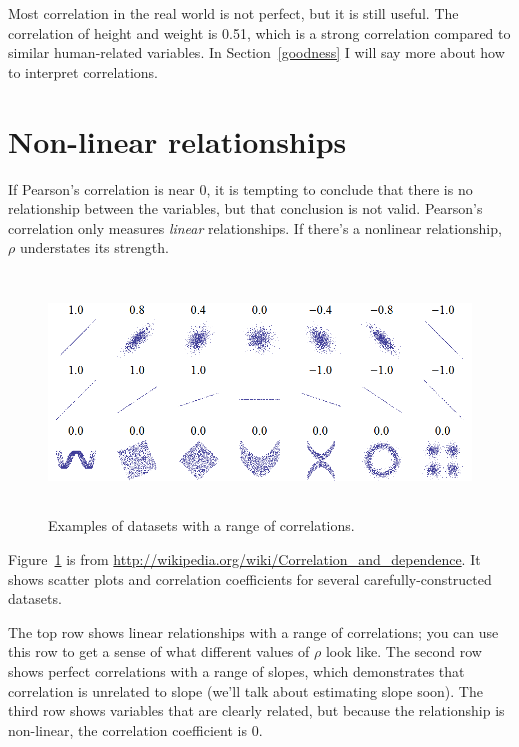 \documentclass[12pt]{book}
\begin{document}
Most correlation in the real world is not perfect, but it is still
useful.  The correlation of height and weight is 0.51, which is a
strong correlation compared to similar human-related variables.  In
Section~\ref{goodness} I will say more about how to interpret
correlations.


\section{Non-linear relationships}

If Pearson's correlation is near 0, it is tempting to conclude
that there is no relationship between the variables, but that
conclusion is not valid.  Pearson's correlation only measures {\em
  linear} relationships.  If there's a nonlinear relationship, $\rho$
understates its strength.  

\begin{figure}
\centerline{\includegraphics[height=2.5in]{figs/Correlation_examples.png}}
\caption{Examples of datasets with a range of correlations.}
\label{corr_examples}
\end{figure}

Figure~\ref{corr_examples} is from
\url{http://wikipedia.org/wiki/Correlation_and_dependence}.  It shows
scatter plots and correlation coefficients for several
carefully-constructed datasets.

The top row shows linear relationships with a range of correlations;
you can use this row to get a sense of what different values of
$\rho$ look like.  The second row shows perfect correlations with a
range of slopes, which demonstrates that correlation is unrelated to
slope (we'll talk about estimating slope soon).  The third row shows
variables that are clearly related, but because the relationship is
non-linear, the correlation coefficient is 0.
\end{document}

